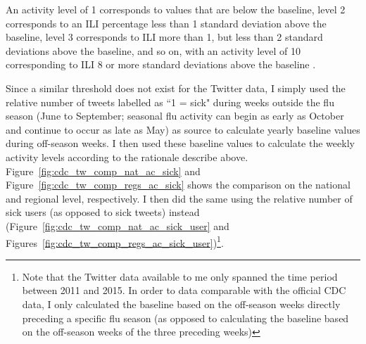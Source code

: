 \documentclass[11pt, a4paper]{report}\usepackage[]{graphicx}\usepackage[]{color}
\begin{document}
An activity level of 1 corresponds to values that are below the baseline, level 2 corresponds to an ILI percentage less than 1 standard deviation above the baseline, level 3 corresponds to ILI more than 1, but less than 2 standard deviations above the baseline, and so on, with an activity level of 10 corresponding to ILI 8 or more standard deviations above the baseline \citep{cdc_surveillance_2016}.\newline
  
Since a similar threshold does not exist for the Twitter data, I simply used the relative number of tweets labelled as ``1 = sick" during weeks outside the flu season (June to September; seasonal flu activity can begin as early as October and continue to occur as late as May) as source to calculate yearly baseline values during off-season weeks. I then used these baseline values to calculate the weekly activity levels according to the rationale describe above. Figure~\ref{fig:cdc_tw_comp_nat_ac_sick} and Figure~\ref{fig:cdc_tw_comp_regs_ac_sick} shows the comparison on the national and regional level, respectively. I then did the same using the relative number of sick users (as opposed to sick tweets) instead (Figure~\ref{fig:cdc_tw_comp_nat_ac_sick_user} and Figures~\ref{fig:cdc_tw_comp_regs_ac_sick_user})\footnote{Note that the Twitter data available to me only spanned the time period between 2011 and 2015. In order to data comparable with the official CDC data, I only calculated the baseline based on the off-season weeks directly preceding a specific flu season (as opposed to calculating the baseline based on the off-season weeks of the three preceding weeks)}.\newline
\end{document}
